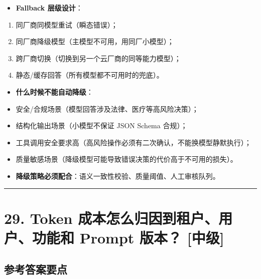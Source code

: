 \documentclass[9pt,a4paper,twocolumn]{ctexart}
\newcommand{\lvzhong}{\usebox{\badgezhongbox}}
\def\lvzhong{[中级]}%
\begin{document}
\begin{itemize}[itemsep=1pt, topsep=2pt]
  \item \textbf{Fallback 层级设计}：
\end{itemize}
\begin{enumerate}[itemsep=1pt, topsep=2pt]
  \item 同厂商同模型重试（瞬态错误）；
  \item 同厂商降级模型（主模型不可用，用同厂小模型）；
  \item 跨厂商切换（切换到另一个云厂商的同等能力模型）；
  \item 静态/缓存回答（所有模型都不可用时的兜底）。
\end{enumerate}
\begin{itemize}[itemsep=1pt, topsep=2pt]
  \item \textbf{什么时候不能自动降级}：
  \item 安全/合规场景（模型回答涉及法律、医疗等高风险决策）；
  \item 结构化输出场景（小模型不保证 JSON Schema 合规）；
  \item 工具调用安全要求高（高风险操作必须有二次确认，不能换模型静默执行）；
  \item 质量敏感场景（降级模型可能导致错误决策的代价高于不可用的损失）。
  \item \textbf{降级策略必须配合}：语义一致性校验、质量阈值、人工审核队列。
\end{itemize}


\vspace{2pt}
\noindent\rule{\columnwidth}{0.3pt}\vspace{2pt}



\section*{29. Token 成本怎么归因到租户、用户、功能和 Prompt 版本？ \lvzhong{}}


\subsection*{参考答案要点}
\end{document}
